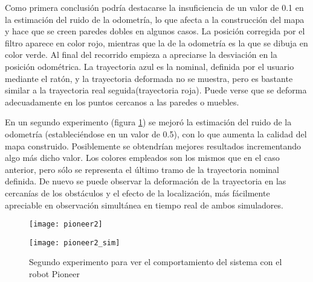  Como primera conclusión podría destacarse la insuficiencia de un valor de 0.1 en la estimación del ruido de la odometría, lo que afecta a la construcción del mapa y hace que se creen paredes dobles en algunos casos. La posición corregida por el filtro aparece en color rojo, mientras que la de la odometría es la que se dibuja en color verde. Al final del recorrido empieza a apreciarse la desviación en la posición odométrica. La trayectoria azul es la nominal, definida por el usuario mediante el ratón, y la trayectoria deformada no se muestra, pero es bastante similar a la trayectoria real seguida(trayectoria roja). Puede verse que se deforma adecuadamente en los puntos cercanos a las paredes o muebles.

 En un segundo experimento (figura \ref{fg:pioneerSim1b}) se mejoró la estimación del ruido de la odometría (estableciéndose en un valor de 0.5), con lo que aumenta la calidad del mapa construido. Posiblemente se obtendrían mejores resultados incrementando algo más dicho valor. Los colores empleados son los mismos que en el caso anterior, pero sólo se representa el último tramo de la trayectoria nominal definida. De nuevo se puede observar la deformación de la trayectoria en las cercanías de los obstáculos y el efecto de la localización, más fácilmente apreciable en observación simultánea en tiempo real de ambos simuladores.

 \begin{figure}[h]
  \centering\texttt{[image: pioneer2]}

  \vspace{0.5cm}

  \centering\texttt{[image: pioneer2\_sim]}
  \caption{Segundo experimento para ver el comportamiento del sistema con el robot Pioneer}\label{fg:pioneerSim1b}
\end{figure} 